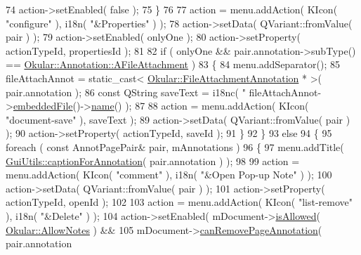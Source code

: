 \begin{DoxyCode}
{74                 action->setEnabled( \textcolor{keyword}{false} );
75         \}
76 
77         action = menu.addAction( KIcon( \textcolor{stringliteral}{"configure"} ), i18n( \textcolor{stringliteral}{"&Properties"} ) );
78         action->setData( QVariant::fromValue( pair ) );
79         action->setEnabled( onlyOne );
80         action->setProperty( actionTypeId, propertiesId );
81 
82         \textcolor{keywordflow}{if} ( onlyOne && pair.annotation->subType() == 
      \hyperlink{classOkular_1_1Annotation_af71b46e37d5f850b97d5c4de3be9aac0a7209cbfb5e13c0f80ac36f87c9575836}{Okular::Annotation::AFileAttachment} )
83         \{
84             menu.addSeparator();
85             fileAttachAnnot = \textcolor{keyword}{static\_cast<} \hyperlink{classOkular_1_1FileAttachmentAnnotation}{Okular::FileAttachmentAnnotation}
       * \textcolor{keyword}{>}( pair.annotation );
86             \textcolor{keyword}{const} QString saveText = i18nc( \textcolor{stringliteral}{"%
      fileAttachAnnot->\hyperlink{classOkular_1_1FileAttachmentAnnotation_a22ff85c689647a6daa6bac053fe60cbb}{embeddedFile}()->\hyperlink{classOkular_1_1EmbeddedFile_a70fcfea705979ce6a31b989fc92a8f2b}{name}() );
87 
88             action = menu.addAction( KIcon( \textcolor{stringliteral}{"document-save"} ), saveText );
89             action->setData( QVariant::fromValue( pair ) );
90             action->setProperty( actionTypeId, saveId );
91         \}
92     \}
93     \textcolor{keywordflow}{else}
94     \{
95         \textcolor{keywordflow}{foreach} ( \textcolor{keyword}{const} AnnotPagePair& pair, mAnnotations )
96         \{
97             menu.addTitle( \hyperlink{namespaceGuiUtils_af15abd3dd32e982db3f842e807146835}{GuiUtils::captionForAnnotation}( pair.annotation ) 
      );
98 
99             action = menu.addAction( KIcon( \textcolor{stringliteral}{"comment"} ), i18n( \textcolor{stringliteral}{"&Open Pop-up Note"} ) );
100             action->setData( QVariant::fromValue( pair ) );
101             action->setProperty( actionTypeId, openId );
102 
103             action = menu.addAction( KIcon( \textcolor{stringliteral}{"list-remove"} ), i18n( \textcolor{stringliteral}{"&Delete"} ) );
104             action->setEnabled( mDocument->\hyperlink{classOkular_1_1Document_a6dd7a475b14222c07d1c410311f35cdb}{isAllowed}( 
      \hyperlink{namespaceOkular_a3601f4e702453ddf1125476dd6e7577ba6c10962833bd58ea0f8d63e448eba8e9}{Okular::AllowNotes} ) &&
105                                 mDocument->\hyperlink{classOkular_1_1Document_a77f5c38224da847413dbe51c5e24ed08}{canRemovePageAnnotation}( pair.annotation 
}}
\end{DoxyCode}
